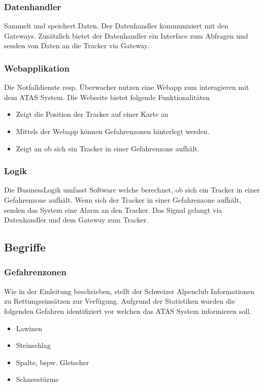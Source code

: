 \documentclass[11pt,english,german]{report}
\theoremstyle{definition}
\begin{document}
\subsubsection{Datenhandler}
Sammelt und speichert Daten. Der Datenhandler kommuniziert mit den Gateways. Zusätzlich bietet der Datenhandler ein Interface zum Abfragen und senden von Daten an die Tracker via Gateway.

\subsubsection{Webapplikation}
Die Notfalldienste resp. Überwacher nutzen eine Webapp zum interagieren mit dem ATAS System. Die Webseite bietet folgende Funktionalitäten
\begin{itemize}
	\item
		Zeigt die Position der Tracker auf einer Karte an 
	\item
		Mittels der Webapp können Gefahrenzonen hinterlegt werden.
	\item 
		Zeigt an ob sich ein Tracker in einer Gefahrenzone aufhält.	
\end{itemize}

\subsubsection{Logik}
Die BusinessLogik umfasst Software welche berechnet, ob sich ein Tracker in einer Gefahrenzone aufhält. Wenn sich der Tracker in einer Gefahrenzone aufhält, senden das System eine Alarm an den Tracker. Das Signal gelangt via Datenhandler und dem Gateway zum Tracker.

\subsection{Begriffe}
\subsubsection{Gefahrenzonen}
Wie in der Einleitung beschrieben, stellt der Schweizer Alpenclub Informationen zu Rettungseinsätzen zur Verfügung. Aufgrund der Statistiken wurden die folgenden Gefahren identifiziert vor welchen das ATAS System informieren soll.
\begin{itemize}
	\item Lawinen
	\item Steinschlag
	\item Spalte, bspw. Gletscher
	\item Schneestürme
\end{itemize}
\end{document}
